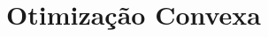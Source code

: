 \documentclass[12pt,a4paper]{scrartcl}
\def\RR{\mathds{R}}
\def\xbar{\bar{x}}
\theoremstyle{definition}%
\newtheorem{defi}{Definição}
\begin{document}








\newpage

\section{Otimização Convexa} \label{chap:otimizacao_convexa}
\end{document}
